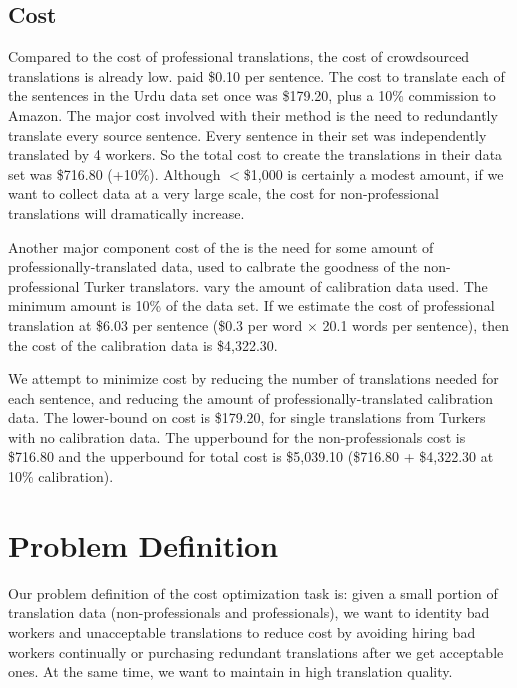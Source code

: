 \documentclass[11pt,letterpaper]{article}
\begin{document}
\subsection{Cost}

Compared to the cost of professional translations, the cost of crowdsourced translations is already low.  paid \$0.10 per sentence.  The cost to translate each of the sentences in the Urdu data set once was \$179.20, plus a 10\% commission to Amazon.  The major cost involved with their method is the need to redundantly translate every source sentence. Every sentence in their set was independently translated by 4 workers.  So the total cost to create the translations in their data set was \$716.80 (+10\%). Although $<$\$1,000 is certainly a modest amount, if we want to collect data at a very large scale, the cost for non-professional translations will dramatically increase.

Another major component cost of the   is the need for some amount of professionally-translated data, used to calbrate the goodness of the non-professional Turker translators.   vary the amount of calibration data used.  The minimum amount is 10\% of the data set.  If we estimate the cost of professional translation at \$6.03 per sentence (\$0.3 per word $\times$ 20.1 words per sentence), then the cost of the calibration data is \$4,322.30.

We attempt to minimize cost by reducing the number of translations needed for each sentence, and reducing the amount of professionally-translated calibration data.  The lower-bound on cost is \$179.20, for single translations from Turkers with no calibration data.  The upperbound for the non-professionals cost is \$716.80 and the upperbound for total cost is \$5,039.10 (\$716.80 + \$4,322.30 at 10\% calibration).
\section{Problem Definition}
Our problem definition of the cost optimization task is: given a small portion of translation data (non-professionals and professionals),  we want to identity bad workers and unacceptable translations to reduce cost by avoiding hiring bad workers continually or purchasing redundant translations after we get acceptable ones. At the same time, we want to maintain in high translation quality.
\end{document}
